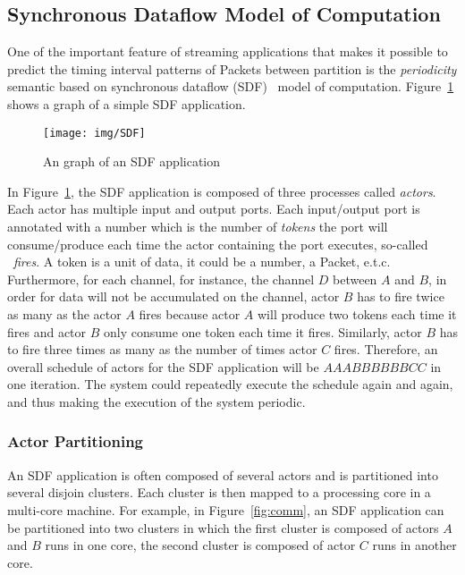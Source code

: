 \documentclass[12pt]{article}
\begin{document}
\subsection{Synchronous Dataflow Model of Computation}\label{sec:SDF}
One of the important feature of streaming applications that makes it possible to
predict the timing interval patterns of Packets between partition is the
\textit{periodicity} semantic based on synchronous dataflow (SDF)~\cite{LeeSDF}
model of computation. Figure~\ref{fig:SDF} shows a graph of a simple SDF
application.

\begin{figure}[ht!]
\centering
\texttt{[image: img/SDF]}
\caption{An graph of an SDF application}\label{fig:SDF}
\end{figure}

In Figure~\ref{fig:SDF}, the SDF application is composed of three processes
called \textit{actors}. Each actor has multiple input and output ports. Each
input/output port is annotated with a number which is the number of
\textit{tokens} the port will consume/produce each time the actor containing the
port executes, so-called ~\textit{fires}. A token is a unit of data, it could be
a number, a Packet, e.t.c. Furthermore, for each channel, for instance, the
channel $D$ between $A$ and $B$, in order for data will not be accumulated on
the channel, actor $B$ has to fire twice as many as the actor $A$ fires because
actor $A$ will produce two tokens each time it fires and actor $B$ only consume
one token each time it fires. Similarly, actor $B$ has to fire three times as
many as the number of times actor $C$ fires. Therefore, an overall schedule of
actors for the SDF application will be $AAABBBBBBCC$ in one iteration. The
system could repeatedly execute the schedule again and again, and thus making
the execution of the system periodic.

\subsubsection{Actor Partitioning}
An SDF application is often composed of several actors and is partitioned into
several disjoin clusters. Each cluster is then mapped to a processing core in a
multi-core machine. For example, in Figure~\ref{fig:comm}, an SDF application
can be partitioned into two clusters in which the first cluster is composed of
actors $A$ and $B$ runs in one core, the second cluster is composed of actor
$C$ runs in another core.
\end{document}

